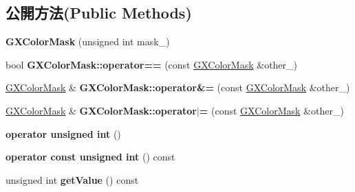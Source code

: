 \subsection*{公開方法(Public Methods)}
\begin{DoxyCompactItemize}
\item 
{\bfseries G\+X\+Color\+Mask} (unsigned int mask\+\_)\hypertarget{class_i_dream_sky_1_1_g_x_color_mask_a4b4f8b7c5de4e240855ac2b56fc13bc7}{}\label{class_i_dream_sky_1_1_g_x_color_mask_a4b4f8b7c5de4e240855ac2b56fc13bc7}

\item 
bool {\bfseries G\+X\+Color\+Mask\+::operator==} (const \hyperlink{class_i_dream_sky_1_1_g_x_color_mask}{G\+X\+Color\+Mask} \&other\+\_\+)\hypertarget{class_i_dream_sky_1_1_g_x_color_mask_adfe4934314865715c818960e79f6f61a}{}\label{class_i_dream_sky_1_1_g_x_color_mask_adfe4934314865715c818960e79f6f61a}

\item 
\hyperlink{class_i_dream_sky_1_1_g_x_color_mask}{G\+X\+Color\+Mask} \& {\bfseries G\+X\+Color\+Mask\+::operator\&=} (const \hyperlink{class_i_dream_sky_1_1_g_x_color_mask}{G\+X\+Color\+Mask} \&other\+\_\+)\hypertarget{class_i_dream_sky_1_1_g_x_color_mask_a8826bf6e1eb13c0d0f6be48f7dfe5582}{}\label{class_i_dream_sky_1_1_g_x_color_mask_a8826bf6e1eb13c0d0f6be48f7dfe5582}

\item 
\hyperlink{class_i_dream_sky_1_1_g_x_color_mask}{G\+X\+Color\+Mask} \& {\bfseries G\+X\+Color\+Mask\+::operator$\vert$=} (const \hyperlink{class_i_dream_sky_1_1_g_x_color_mask}{G\+X\+Color\+Mask} \&other\+\_\+)\hypertarget{class_i_dream_sky_1_1_g_x_color_mask_adbaba9dd2677b3bb8b76323b9383cdf1}{}\label{class_i_dream_sky_1_1_g_x_color_mask_adbaba9dd2677b3bb8b76323b9383cdf1}

\item 
{\bfseries operator unsigned int} ()\hypertarget{class_i_dream_sky_1_1_g_x_color_mask_a9b60042a4b19cb23a4a26f6c899f8c65}{}\label{class_i_dream_sky_1_1_g_x_color_mask_a9b60042a4b19cb23a4a26f6c899f8c65}

\item 
{\bfseries operator const unsigned int} () const \hypertarget{class_i_dream_sky_1_1_g_x_color_mask_af2186fd904b78643ba279afd57fc0e12}{}\label{class_i_dream_sky_1_1_g_x_color_mask_af2186fd904b78643ba279afd57fc0e12}

\item 
unsigned int {\bfseries get\+Value} () const \hypertarget{class_i_dream_sky_1_1_g_x_color_mask_a89204a2a28a395eef0d1fe078e61cace}{}\label{class_i_dream_sky_1_1_g_x_color_mask_a89204a2a28a395eef0d1fe078e61cace}


\end{DoxyCompactItemize}
